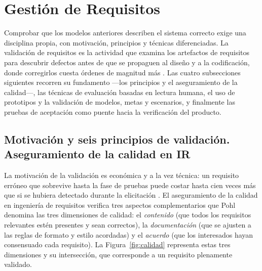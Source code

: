 \documentclass[11pt,a4paper,oneside]{report}
\begin{document}
	\section{Gesti\'on de Requisitos}
	
	Comprobar que los modelos anteriores describen el sistema correcto exige una disciplina propia, con motivaci\'on, principios y t\'ecnicas diferenciadas. La validaci\'on de requisitos es la actividad que examina los artefactos de requisitos para descubrir defectos antes de que se propaguen al dise\~no y a la codificaci\'on, donde corregirlos cuesta \'ordenes de magnitud m\'as \citep{pohl_2010,sommerville_2016}. Las cuatro subsecciones siguientes recorren su fundamento ---los principios y el aseguramiento de la calidad---, las t\'ecnicas de evaluaci\'on basadas en lectura humana, el uso de prototipos y la validaci\'on de modelos, metas y escenarios, y finalmente las pruebas de aceptaci\'on como puente hacia la verificaci\'on del producto.
	
	\subsection{Motivaci\'on y seis principios de validaci\'on. Aseguramiento de la calidad en IR}
	
	La motivaci\'on de la validaci\'on es econ\'omica y a la vez t\'ecnica: un requisito err\'oneo que sobrevive hasta la fase de pruebas puede costar hasta cien veces m\'as que si se hubiera detectado durante la elicitaci\'on \citep{sommerville_2016}. El aseguramiento de la calidad en ingenier\'ia de requisitos verifica tres aspectos complementarios que Pohl~\citep{pohl_2010} denomina las tres dimensiones de calidad: el \textit{contenido} (que todos los requisitos relevantes est\'en presentes y sean correctos), la \textit{documentaci\'on} (que se ajusten a las reglas de formato y estilo acordadas) y el \textit{acuerdo} (que los interesados hayan consensuado cada requisito). La Figura~\ref{fig:calidad} representa estas tres dimensiones y su intersecci\'on, que corresponde a un requisito plenamente validado.
	
\end{document}
